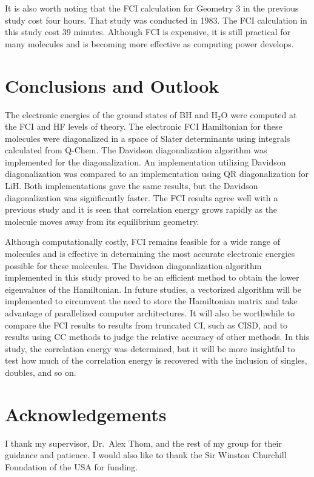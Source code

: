 \documentclass[final,3p,times,twocolumn]{elsarticle}
\begin{document}
It is also worth noting that the FCI calculation for Geometry 3 in the previous study cost four hours.\cite{handy-1983} That study was conducted in 1983. The FCI calculation in this study cost 39 minutes. Although FCI is expensive, it is still practical for many molecules and is becoming more effective as computing power develops.


\section{Conclusions and Outlook}
\label{sect:Concl}
The electronic energies of the ground states of BH and H$_2$O were computed at the FCI and HF levels of theory. The electronic FCI Hamiltonian for these molecules were diagonalized in a space of Slater determinants using integrals calculated from Q-Chem. The Davidson diagonalization algorithm was implemented for the diagonalization. An implementation utilizing Davidson diagonalization was compared to an implementation using QR diagonalization for LiH. Both implementations gave the same results, but the Davidson diagonalization was significantly faster. The FCI results agree well with a previous study\cite{handy-1983} and it is seen that correlation energy grows rapidly as the molecule moves away from its equilibrium geometry.

Although computationally costly, FCI remains feasible for a wide range of molecules and is effective in determining the most accurate electronic energies possible for these molecules. The Davidson diagonalization algorithm implemented in this study proved to be an efficient method to obtain the lower eigenvalues of the Hamiltonian. In future studies, a vectorized algorithm will be implemented to circumvent the need to store the Hamiltonian matrix and take advantage of parallelized computer architectures.\cite{handy-1983} It will also be worthwhile to compare the FCI results to results from truncated CI, such as CISD, and to results using CC methods to judge the relative accuracy of other methods. In this study, the correlation energy was determined, but it will be more insightful to test how much of the correlation energy is recovered with the inclusion of singles, doubles, and so on.

\section*{Acknowledgements}
I thank my supervisor, Dr.\ Alex Thom, and the rest of my group for their guidance and patience. I would also like to thank the Sir Winston Churchill Foundation of the USA for funding.
\end{document}
